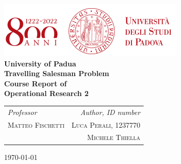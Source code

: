 
\begin{titlepage}
  \clearpage\thispagestyle{empty}
  \centering
  \vspace{2cm}

  \includegraphics[scale=0.75]{uniLogo.png} \\ [1cm]
  \LARGE\textbf{University of Padua} \\ [4cm]
  \Huge\textbf{Travelling Salesman Problem} \\ [1cm]
  \Large\textbf{Course Report of \\ Operational Research 2} \\ [4cm]
  \begin{table}[h]
    \begin{tabularx}{\textwidth}{X r}

        \Large\textit{Professor}  & \Large\textit{Author, ID number} \\ [0.2cm]
        \Large\textsc{Matteo Fischetti}  & \Large\textsc{Luca Perali, 1237770} \\ [0.2cm]
          & \Large\textsc{Michele Thiella } \\ [0.3cm]
        \hline
    \end{tabularx}
  \end{table}

  \textsc\Large \today \\ [2cm]

  \pagebreak
\end{titlepage}
